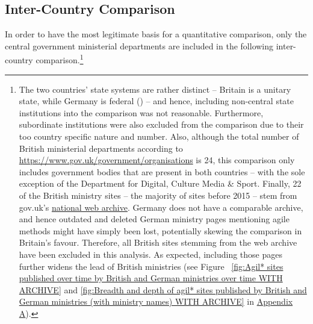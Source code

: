 \subsection{Inter-Country Comparison}\label{Inter-Country Comparison} 
\begin{wrapfigure}[10]{r}{0.5\textwidth}
	\centering
	\vspace{-14pt}
	 \texttt{[image: \{"Code/3\_Data\_Analysis/visualisations/british\_vs\_German\_federal\_ministries\_over\_time\_without\_archive"]}.pdf}
	 \setlength{\belowcaptionskip}{-30pt}
	 \caption[Agil* sites published by British and German central government ministerial departments over time]{Agil* sites published by British and German central government ministerial departments over time}
	 \label{fig:Agil* sites published over time by British and German ministries over time}
\end{wrapfigure}
In order to have the most legitimate basis for a quantitative comparison, only the central government ministerial departments are included in the following inter-country comparison.\footnote{The two countries' state systems are rather distinct – Britain is a unitary state, while Germany is federal (\cite{Elazar1997}) – and hence, including non-central state institutions into the comparison was not reasonable. Furthermore, subordinate institutions were also excluded from the comparison due to their too country specific nature and number. Also, although the total number of British ministerial departments according to \url{https://www.gov.uk/government/organisations} is 24, this comparison only includes government bodies that are present in both countries – with the sole exception of the Department for Digital, Culture Media \& Sport. Finally, 22 of the British ministry sites – the majority of sites before 2015 – stem from gov.uk's \href{https://webarchive.nationalarchives.gov.uk/search/}{national web archive}. Germany does not have a comparable archive, and hence outdated and deleted German ministry pages mentioning agile methods might have simply been lost, potentially skewing the comparison in Britain's favour. Therefore, all British sites stemming from the web archive have been excluded in this analysis. As expected, including those pages further widens the lead of British ministries (see Figure
~\ref{fig:Agil* sites published over time by British and German ministries over time WITH ARCHIVE} and \ref{fig:Breadth and depth of agil* sites published by British and German ministries (with ministry names) WITH ARCHIVE} in \hyperref[Appendix A]{Appendix A}).} 

